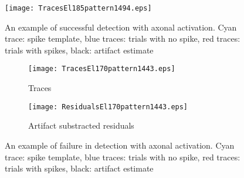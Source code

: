 \pagebreak
\begin{figure}[h!]
          \centering
                \texttt{[image: TracesEl185pattern1494.eps]} 
                \caption{An example of successful detection with axonal activation. Cyan trace: spike template, blue traces: trials with no spike, red traces: trials with spikes, black: artifact estimate}
\end{figure}


 \begin{figure}[h!]
        \centering
        \begin{subfigure}[b]{\textwidth}
                \texttt{[image: TracesEl170pattern1443.eps]}
   \caption{Traces}
                \label{fig:gull}
        \end{subfigure}%
\centering

\begin{subfigure}[b]{\textwidth}
                \texttt{[image: ResidualsEl170pattern1443.eps]}
                \label{fig:tiger}
                \caption{Artifact substracted residuals}
        \end{subfigure}
\caption{An example of failure in detection with axonal activation. Cyan trace: spike template, blue traces: trials with no spike, red traces: trials with spikes, black: artifact estimate}
\end{figure}
